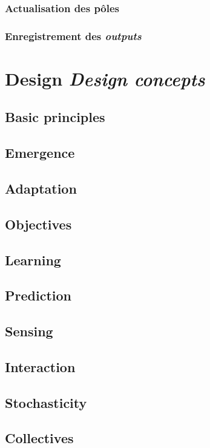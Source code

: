 \subsubsection{Actualisation des pôles}

\subsubsection{Enregistrement des \textit{outputs}}


\section[Design -- \textit{Design concepts}]{Design \protect\newline \large{\textit{Design concepts}} }

\subsection*{Basic principles}
\subsection*{Emergence}
\subsection*{Adaptation}
\subsection*{Objectives}
\subsection*{Learning}
\subsection*{Prediction}
\subsection*{Sensing}
\subsection*{Interaction}
\subsection*{Stochasticity}
\subsection*{Collectives}

